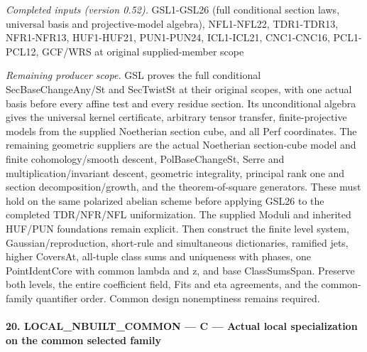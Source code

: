 \emph{Completed inputs (version 0.52).} GSL1-GSL26 (full conditional section laws, universal basis and projective-model algebra), NFL1-NFL22, TDR1-TDR13, NFR1-NFR13, HUF1-HUF21, PUN1-PUN24, ICL1-ICL21, CNC1-CNC16, PCL1-PCL12, GCF/WRS at original supplied-member scope

\emph{Remaining producer scope.} GSL proves the full conditional SecBaseChangeAny/St and SecTwistSt at their original scopes, with one actual basis before every affine test and every residue section. Its unconditional algebra gives the universal kernel certificate, arbitrary tensor transfer, finite-projective models from the supplied Noetherian section cube, and all Perf coordinates. The remaining geometric suppliers are the actual Noetherian section-cube model and finite cohomology/smooth descent, PolBaseChangeSt, Serre and multiplication/invariant descent, geometric integrality, principal rank one and section decomposition/growth, and the theorem-of-square generators. These must hold on the same polarized abelian scheme before applying GSL26 to the completed TDR/NFR/NFL uniformization. The supplied Moduli and inherited HUF/PUN foundations remain explicit. Then construct the finite level system, Gaussian/reproduction, short-rule and simultaneous dictionaries, ramified jets, higher CoversAt, all-tuple class sums and uniqueness with phases, one PointIdentCore with common lambda and z, and base ClassSumsSpan. Preserve both levels, the entire coefficient field, Fits and eta agreements, and the common-family quantifier order. Common design nonemptiness remains required.



\paragraph{20. LOCAL\_\allowbreak NBUILT\_\allowbreak COMMON — C — Actual local specialization on the common selected family}

